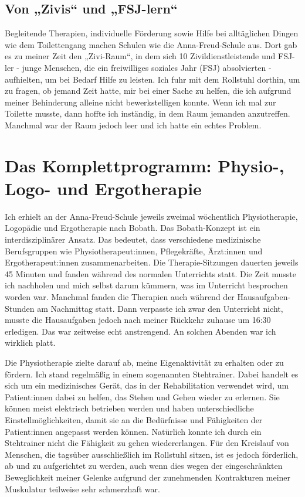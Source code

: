 \documentclass[fontsize=14pt,a4paper,headinclude,DIV=calc,automark]{scrbook}
\begin{document}
\subsection{Von „Zivis“ und „FSJ-lern“}

Begleitende Therapien, individuelle Förderung sowie Hilfe bei alltäglichen Dingen wie dem Toilettengang machen Schulen wie die Anna-Freud-Schule aus. Dort gab es zu meiner Zeit den „Zivi-Raum“, in dem sich 10 Zivildienstleistende und FSJ-ler - junge Menschen, die ein freiwilliges soziales Jahr (FSJ) absolvierten - aufhielten, um bei Bedarf Hilfe zu leisten. Ich fuhr mit dem Rollstuhl dorthin, um zu fragen, ob jemand Zeit hatte, mir bei einer Sache zu helfen, die ich aufgrund meiner Behinderung alleine nicht bewerkstelligen konnte. Wenn ich mal zur Toilette musste, dann hoffte ich inständig, in dem Raum jemanden anzutreffen. Manchmal war der Raum jedoch leer und ich hatte ein echtes Problem.

\section{Das Komplettprogramm: Physio-, Logo- und Ergotherapie}

Ich erhielt an der Anna-Freud-Schule jeweils zweimal wöchentlich Physiotherapie, Logopädie und Ergotherapie nach Bobath. Das Bobath-Konzept ist ein interdisziplinärer Ansatz. Das bedeutet, dass verschiedene medizinische Berufsgruppen wie Physiotherapeut:innen, Pflegekräfte, Ärzt:innen und Ergotherapeut:innen zusammenarbeiten. Die Therapie-Sitzungen dauerten jeweils 45 Minuten und fanden während des normalen Unterrichts statt. Die Zeit musste ich nachholen und mich selbst darum kümmern, was im Unterricht besprochen worden war. Manchmal fanden die Therapien auch während der Hausaufgaben-Stunden am Nachmittag statt. Dann verpasste ich zwar den Unterricht nicht, musste die Hausaufgaben jedoch nach meiner Rückkehr zuhause um 16:30 erledigen. Das war zeitweise echt anstrengend. An solchen Abenden war ich wirklich platt.

Die Physiotherapie zielte darauf ab, meine Eigenaktivität zu erhalten oder zu fördern. Ich stand regelmäßig in einem sogenannten Stehtrainer. Dabei handelt es sich um ein medizinisches Gerät, das in der Rehabilitation verwendet wird, um Patient:innen dabei zu helfen, das Stehen und Gehen wieder zu erlernen. Sie können meist elektrisch betrieben werden und haben unter­schiedliche Einstellmöglichkeiten, damit sie an die Bedürfnisse und Fähigkeiten der Patient:innen angepasst werden können. Natürlich konnte ich durch ein Stehtrainer nicht die Fähigkeit zu gehen wiedererlangen. Für den Kreislauf von Menschen, die tagsüber ausschließlich im Rollstuhl sitzen, ist es jedoch förderlich, ab und zu aufgerichtet zu werden, auch wenn dies wegen der eingeschränkten Beweglichkeit meiner Gelenke aufgrund der zunehmenden Kontrakturen meiner Muskulatur teilweise sehr schmerzhaft war.
\end{document}
